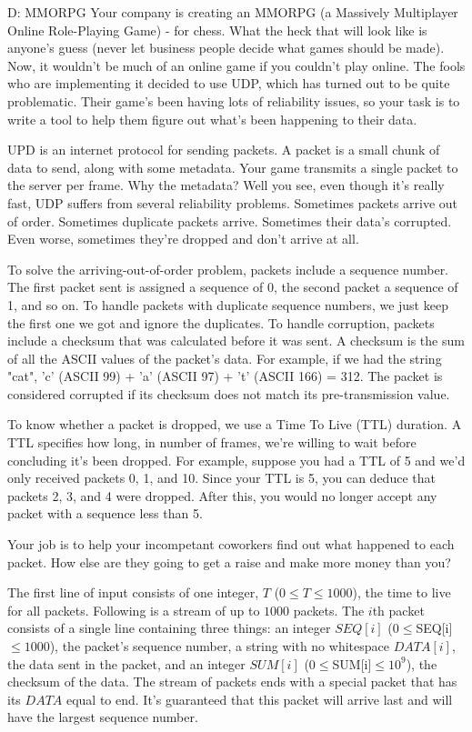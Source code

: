 \begin{problem}{D: MMORPG}
Your company is creating an MMORPG (a Massively Multiplayer Online Role-Playing Game) - for chess. What the heck that will look like is anyone's guess (never let business people decide what games should be made). Now, it wouldn't be much of an online game if you couldn't play online. The fools who are implementing it decided to use UDP, which has turned out to be quite problematic. Their game's been having lots of reliability issues, so your task is to write a tool to help them figure out what's been happening to their data.

UPD is an internet protocol for sending packets. A packet is a small chunk of data to send, along with some metadata. Your game transmits a single packet to the server per frame. Why the metadata? Well you see, even though it's really fast, UDP suffers from several reliability problems. Sometimes packets arrive out of order. Sometimes duplicate packets arrive. Sometimes their data's corrupted. Even worse, sometimes they're dropped and don't arrive at all.

To solve the arriving-out-of-order problem, packets include a sequence number. The first packet sent is assigned a sequence of 0, the second packet a sequence of 1, and so on. To handle packets with duplicate sequence numbers, we just keep the first one we got and ignore the duplicates. To handle corruption, packets include a checksum that was calculated before it was sent. A checksum is the sum of all the ASCII values of the packet's data. For example, if we had the string "cat", 'c' (ASCII 99) + 'a' (ASCII 97) + 't' (ASCII 166) = 312. The packet is considered corrupted if its checksum does not match its pre-transmission value. 

To know whether a packet is dropped, we use a Time To Live (TTL) duration. A TTL specifies how long, in number of frames, we're willing to wait before concluding it's been dropped. For example, suppose you had a TTL of 5 and we'd only received packets 0, 1, and 10. Since your TTL is 5, you can deduce that packets 2, 3, and 4 were dropped. After this, you would no longer accept any packet with a sequence less than 5.

Your job is to help your incompetant coworkers find out what happened to each packet. How else are they going to get a raise and make more money than you?
\end{problem}

\begin{formalin}
The first line of input consists of one integer, $T$ ($0 \leq T \leq 1000$), the time to live for all packets. Following is a stream of up to $1000$ packets. The $i$th packet consists of a single line containing three things: an integer $SEQ[i]$ ($0 \leq $SEQ[i]$ \leq 1000$), the packet's sequence number, a string with no whitespace $DATA[i]$, the data sent in the packet, and an integer $SUM[i]$ ($0 \leq $SUM[i]$ \leq 10^{9}$), the checksum of the data. The stream of packets ends with a special packet that has its $DATA$ equal to end. It's guaranteed that this packet will arrive last and will have the largest sequence number.

\end{formalin}

